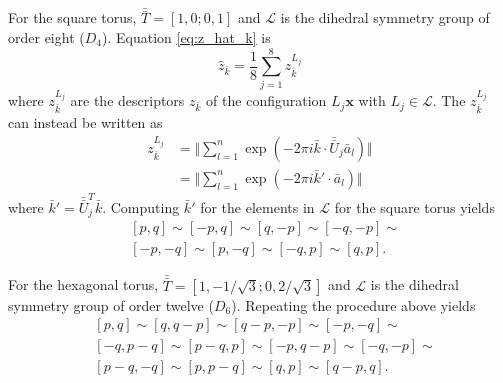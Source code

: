 \documentclass[default,iicol]{sn-jnl}%
\theoremstyle{thmstyleone}%
\theoremstyle{thmstyletwo}%
\theoremstyle{thmstylethree}%
\renewcommand{\vec}[1]{\bar{#1}}
\providecommand{\mat}[1]{\bar{\bar{#1}}}
\providecommand{\config}[1]{\mathbf{#1}}
\providecommand{\rmi}{i}
\begin{document}
\begin{appendices}
	For the square torus, $\mat{T} = [1, 0; 0, 1]$ and $\mathcal{L}$ is the dihedral symmetry group of order eight ($D_4$). Equation \ref{eq:z_hat_k} is
	\begin{equation*}
	\hat{z}_{\vec{k}} = \frac{1}{8} \sum_{j = 1}^{8} z_{\vec{k}}^{L_j}
	\end{equation*}
	where $z_{\vec{k}}^{L_j}$ are the descriptors $z_{\vec{k}}$ of the configuration $L_j \config{x}$ with $L_j \in \mathcal{L}$. The $z_{\vec{k}}^{L_j}$ can instead be written as
	\begin{align*} 
	z_{\vec{k}}^{L_j} &= \bigg\Vert \sum_{l = 1}^{n} \exp{(-2\pi \rmi 
		\vec{k} \cdot \mat{U}_j \vec{a}_l)} \bigg\Vert \nonumber \\
		&= \bigg\Vert \sum_{l = 1}^{n} \exp{(-2\pi \rmi 
		\vec{k}' \cdot \vec{a}_l)} \bigg\Vert
	\end{align*}
	where $\vec{k}' = \mat{U}_j^T \vec{k}$. Computing $\vec{k}'$ for the elements in $\mathcal{L}$ for the square torus yields
	\begin{align*}
		& [p,q] \sim [-p,q] \sim [q,-p] \sim [-q,-p ] \sim \nonumber \\
		& [-p,-q]  \sim [p,-q] \sim [-q,p] \sim [q,p].
	\end{align*}
	
	For the hexagonal torus, $\mat{T} = [1, -1/\sqrt{3}; 0, 2 / \sqrt{3}]$ and $\mathcal{L}$ is the dihedral symmetry group of order twelve ($D_6$). Repeating the procedure above yields
	\begin{align*}
		& [p,q] \sim [q,q-p] \sim [q-p,-p] \sim [-p,-q] \sim \nonumber \\
		& [-q,p-q] \sim [p-q,p] \sim [-p,q-p] \sim [-q,-p] \sim \nonumber \\
		& [p-q,-q] \sim [p,p-q] \sim [q,p] \sim [q-p,q].
	\end{align*}

\end{appendices}







\end{document}
